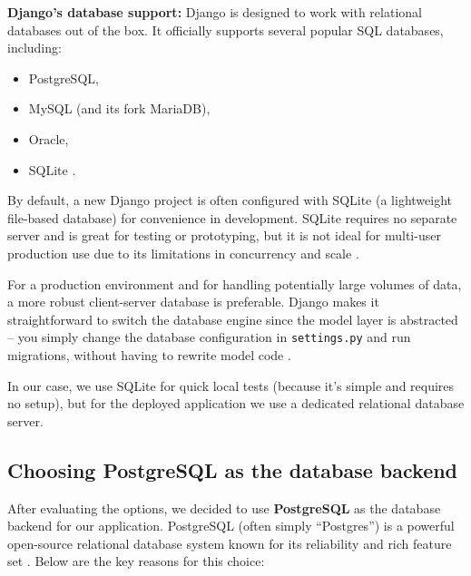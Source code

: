 \noindent
\textbf{Django’s database support:} Django is designed to work with relational 
databases out of the box. It officially supports several popular SQL databases, 
including:
\begin{itemize}
	\item PostgreSQL, 
	\item MySQL (and its fork MariaDB), 
	\item Oracle, 
	\item SQLite \parencite{DjangoDatabases}.
\end{itemize}

By default, a new Django project is often configured with SQLite (a lightweight 
file-based database) for convenience in development. SQLite requires no 
separate server and is great for testing or prototyping, but it is not ideal 
for multi-user production use due to its limitations in concurrency and 
scale \parencite{SQLiteAppropriateUses}. 

For a production environment and for handling potentially large volumes of 
data, a more robust client-server database is preferable. Django makes it 
straightforward to switch the database engine since the model layer is 
abstracted – you simply change the database configuration in 
\texttt{settings.py} and run migrations, without having to rewrite model 
code \parencite{DjangoMigrations}. 

\medskip

In our case, we use SQLite for quick local tests (because it’s simple and 
requires no setup), but for the deployed application we use a dedicated 
relational database server.

\subsection{Choosing PostgreSQL as the database backend} 

After evaluating the options, we decided to use \textbf{PostgreSQL} as the database backend for our application. PostgreSQL (often simply “Postgres”) is a powerful open-source relational database system known for its reliability and rich feature set \parencite{PostgresAbout}. Below are the key reasons for this choice: 

